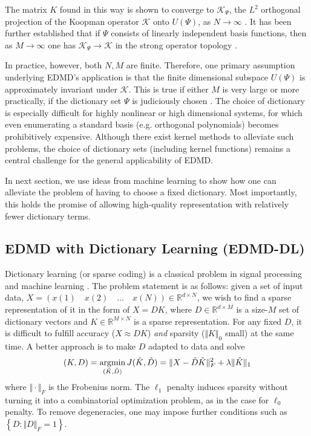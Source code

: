 \documentclass[%
 aip,
 cha,
 sd,%
 amsmath,amssymb,
 preprint,%
]{revtex4-1}
\begin{document}
The matrix $K$ found in this way is shown to converge to $\mathcal{K}_\Psi$, the $L^2$ orthogonal projection of the Koopman operator $\mathcal{K}$ onto $U(\Psi)$, as $N\rightarrow\infty$ \cite{rowleyweb17,williams2015data}. It has been further established that if $\Psi$ consists of linearly independent basis functions, then as $M\rightarrow\infty$ one has $\mathcal{K}_\Psi \rightarrow \mathcal{K}$ in the strong operator topology \cite{korda2017convergence}. 

In practice, however, both $N,M$ are finite. Therefore, one primary assumption underlying EDMD's application is that the finite dimensional subspace $U(\Psi)$ is approximately invariant under $\mathcal{K}$. This is true if either $M$ is very large or more practically, if the dictionary set $\Psi$ is judiciously chosen \cite{williams2015data}. The choice of dictionary is especially difficult for highly nonlinear or high dimensional systems, for which even enumerating a standard basis (e.g. orthogonal polynomials) becomes prohibitively expensive. Although there exist kernel methods \cite{williams2014kernel} to alleviate such problems, the choice of dictionary sets (including kernel functions) remains a central challenge for the general applicability of EDMD. 

In next section, we use ideas from machine learning to show how one can alleviate the problem of having to choose a fixed dictionary. Most importantly, this holds the promise of allowing high-quality representation with relatively fewer dictionary terms. 

\subsection{EDMD with Dictionary Learning (EDMD-DL)}

Dictionary learning (or sparse coding) is a classical problem in signal
processing and machine learning \cite{donoho2006compressed}. The problem statement is as follows: given a set of input data,
$X=\left(x(1)\quad x(2)\quad...\quad x(N)\right)\in\mathbb{R}^{d\times N}$, 
we wish to find a sparse representation of it in the form of $X=DK$, where $D\in\mathbb{R}^{d\times M}$
is a size-$M$ set of dictionary vectors and $K\in\mathbb{R}^{M\times N}$ is a sparse representation. 
For any fixed $D$, it is difficult to fulfill accuracy ($X\approx DK$) {\it and} sparsity ($\Vert K\Vert_0$ small)
at the same time. A better approach is to make $D$ adapted to data and solve
\begin{equation}
(K,D) = \operatornamewithlimits{arg min}_{(\tilde{K},\tilde{D})} J(\tilde{K},\tilde{D}) =  \Vert X-\tilde{D}\tilde{K}\Vert_{F}^{2}+\lambda\Vert \tilde{K}\Vert_{1}
\label{eq:var_dict_learning}
\end{equation}
where $\Vert\cdot\Vert_{F}$ is the Frobenius norm. The $\ell_{1}$
penalty induces sparsity without turning it into a combinatorial optimization problem, as in the case for $\ell_0$ penalty. To remove degeneracies, one may impose further conditions such as $\left\{ D:\Vert D\Vert_{F}=1\right\}$. 
\end{document}
